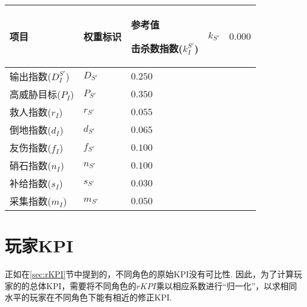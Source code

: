 \documentclass{ctexart}
\begin{document}
\begin{longtable}{|>{\centering\arraybackslash}p{8em}|>{\centering\arraybackslash}p{4em}|>{\centering\arraybackslash}p{6em}|}
    \hline

    项目                & 权重标识     & 参考值     \endhead

    \hline

    击杀数指数($k_I^{S'}$) & $k_{S'}$ & $0.000$          \\

    \hline

    输出指数($D_I^{S'}$)  & $D_{S'}$ & $0.250$          \\

    \hline

    高威胁目标($P_I$)      & $P_{S'}$ & $0.350$          \\

    \hline

    救人指数($r_I$)       & $r_{S'}$ & $0.055$          \\

    \hline

    倒地指数($d_I$)       & $d_{S'}$ & $0.065$          \\

    \hline

    友伤指数($f_I$)       & $f_{S'}$ & $0.100$          \\

    \hline

    硝石指数($n_I$)       & $n_{S'}$ & $0.100$          \\

    \hline

    补给指数($s_I$)       & $s_{S'}$ & $0.030$          \\

    \hline

    采集指数($m_I$)       & $m_{S'}$ & $0.050$          \\

    \hline
\end{longtable}

\section{玩家KPI}

正如在\ref{sec:rKPI}节中提到的，不同角色的原始KPI没有可比性.
因此，为了计算玩家的的总体KPI，需要将不同角色的$rKPI$乘以相应系数进行“归一化”，以求相同水平的玩家在不同角色下能有相近的修正KPI.
\end{document}

